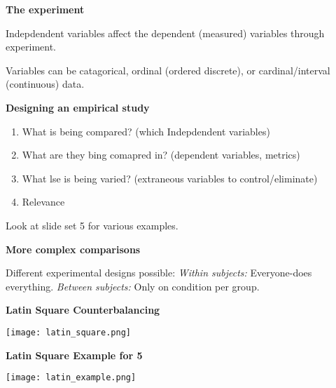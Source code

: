 \textbf{The experiment}

Indepdendent variables affect the dependent (measured) variables through experiment.

Variables can be catagorical, ordinal (ordered discrete), or cardinal/interval (continuous) data. \medskip

\textbf{Designing an empirical study}

\begin{enumerate}
    \item What is being compared? (which Indepdendent variables)
    \item What are they bing comapred in? (dependent variables, metrics)
    \item What lse is being varied? (extraneous variables to control/eliminate)
    \item Relevance
\end{enumerate}

Look at slide set 5 for various examples. \medskip

\textbf{More complex comparisons}

Different experimental designs possible: \textit{Within subjects:} Everyone-does everything. \textit{Between subjects:} Only on condition per group. \medskip

\textbf{Latin Square Counterbalancing}

\begin{center}
	\texttt{[image: latin\_square.png]}
\end{center}


\textbf{Latin Square Example for 5}

\begin{center}
	\texttt{[image: latin\_example.png]}
\end{center}